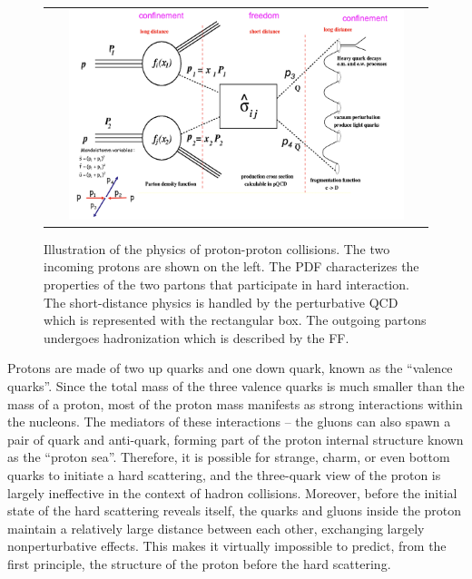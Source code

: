 \begin{figure}[tbh!]
 \begin{center}
 \begin{tabular}{c}
 \includegraphics[width=0.9\textwidth]{figures/Part1/QCD/factorization}
 \end{tabular}
 \caption{Illustration of the physics of proton-proton collisions. The two incoming protons are shown on the left. The \ac{PDF} characterizes the properties of the two partons that participate in hard interaction. The short-distance physics is handled by the perturbative \ac{QCD} which is represented with the rectangular box. The outgoing partons undergoes hadronization which is described by the \ac{FF}.~\cite{Huston:fact}}
 \label{fig:factorization}
 \end{center}
\end{figure}

Protons are made of two up quarks and one down quark, known as the ``valence quarks''. Since the total mass of the three valence quarks is much smaller than the mass of a proton, most of the proton mass manifests as strong interactions within the nucleons. The mediators of these interactions -- the gluons can also spawn a pair of quark and anti-quark, forming part of the proton internal structure known as the ``proton sea''. Therefore, it is possible for strange, charm, or even bottom quarks to initiate a hard scattering, and the three-quark view of the proton is largely ineffective in the context of hadron collisions. Moreover, before the initial state of the hard scattering reveals itself, the quarks and gluons inside the proton maintain a relatively large distance between each other, exchanging largely nonperturbative effects. This makes it virtually impossible to predict, from the first principle, the structure of the proton before the hard scattering. 

